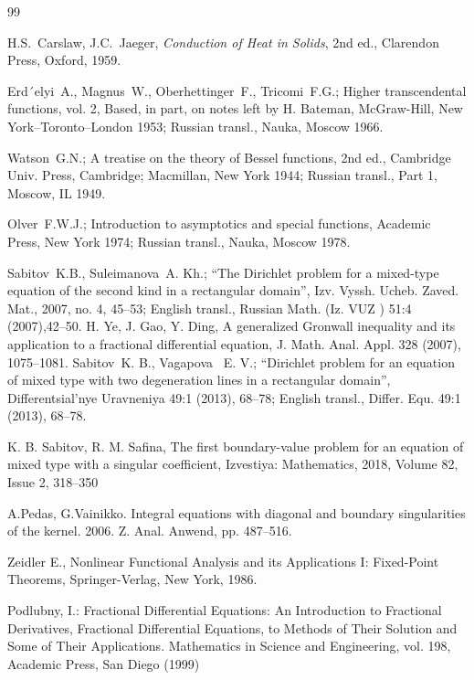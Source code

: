 \documentclass[reqno]{amsart}
\theoremstyle{definition}
\numberwithin{equation}{section}
\begin{document}
\newpage
\begin{thebibliography}{99}

 H.S.~Carslaw, J.C.~Jaeger,
\textit{Conduction of Heat in Solids},
2nd ed., Clarendon Press, Oxford, 1959.

  Erd´elyi~A., Magnus~W., Oberhettinger~F., Tricomi~F.G.; Higher transcendental functions, vol. 2, Based, in part, on notes left by H. Bateman,
McGraw-Hill, New York–Toronto–London 1953; Russian transl., Nauka, Moscow
1966.

  Watson~G.N.; A treatise on the theory of Bessel functions, 2nd ed., Cambridge Univ. Press, Cambridge; Macmillan, New York 1944; Russian transl., Part 1, Moscow, IL 1949.

 Olver~F.W.J.; Introduction to asymptotics and special functions, Academic Press, New York 1974; Russian transl., Nauka, Moscow 1978. 

 Sabitov~K.B.,  Suleimanova~A. Kh.; “The Dirichlet problem for a mixed-type equation of the second kind in a rectangular domain”, Izv. Vyssh. Ucheb. Zaved. Mat., 2007, no. 4, 45–53; English transl., Russian Math. (Iz. VUZ ) 51:4 (2007),42–50.
H. Ye, J. Gao, Y. Ding, A generalized Gronwall inequality 
and its application to a fractional differential equation, 
J. Math. Anal. Appl. 328 (2007), 1075–1081.
 Sabitov~K. B., Vagapova~ E. V.; “Dirichlet problem for an equation of mixed type with two degeneration lines in a rectangular domain”, Differentsial’nye Uravneniya 49:1 (2013), 68–78; English transl., Differ. Equ. 49:1 (2013), 68–78.


K. B. Sabitov, R. M. Safina, The first boundary-value problem for an equation of mixed type with a singular coefficient, Izvestiya: Mathematics, 2018, Volume 82, Issue 2, 318–350

A.Pedas, G.Vainikko. Integral equations with diagonal and boundary singularities of the kernel. 2006.
Z. Anal. Anwend, pp. 487–516.

Zeidler E., Nonlinear Functional Analysis and its Applications I: Fixed-Point Theorems,
Springer-Verlag, New York, 1986.

 Podlubny, I.: Fractional Differential Equations: An Introduction to Fractional Derivatives, Fractional
Differential Equations, to Methods of Their Solution and Some of Their Applications. Mathematics in
Science and Engineering, vol. 198, Academic Press, San Diego (1999)


\end{thebibliography}
\end{document}
